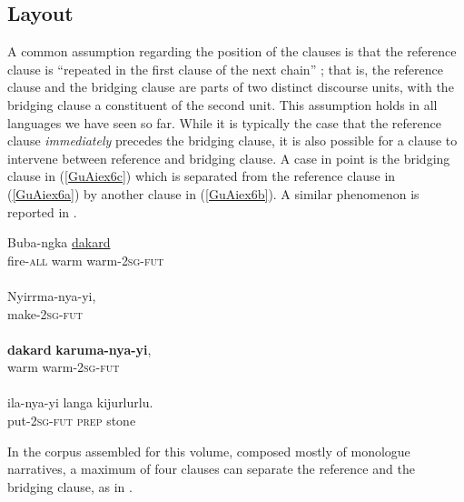 \documentclass[output=paper]{LSP/langsci}
\begin{document}
\subsection{Layout}
\label{GuAi2.1layout}
A common assumption regarding the position of the clauses is that the reference clause is ``repeated in the first clause of the next chain'' \citep[][363]{devries.2005}; that is, the reference clause and the bridging clause are parts of two distinct discourse units, with the bridging clause a constituent of the second unit. This assumption holds in all languages we have seen so far. While it is typically the case that the reference clause \textit{immediately} precedes the bridging clause, it is also possible for a clause to intervene between reference and bridging clause. A case in point is the bridging clause in (\ref{GuAiex6c}) which is separated from the reference clause in (\ref{GuAiex6a}) by another clause in (\ref{GuAiex6b}). A similar phenomenon is reported in  .

\begin{exe}
	\ex	\label{GuAiex6ad}
 {\citealt[][]{Pensalfini}}
\begin{xlist}
\ex	\label{GuAiex6a}
\gll		Buba-ngka   \underline{dakard}     \underline{} \\
			fire-\textsc{all}   warm     warm-\textsc{2sg-fut}\\
		\glt	{} \\
\ex	\label{GuAiex6b}
\gll		Nyirrma-nya-yi, \\
			make-\textsc{2sg-fut} \\
		\glt	{} \\
\ex	\label{GuAiex6c}
\gll		\textbf{dakard}   \textbf{karuma-nya-yi},  \\
			warm    warm-\textsc{2sg-fut}\\
		\glt	{} \\
\ex	\label{GuAiex6d}
\gll ila-nya-yi   langa   kijurlurlu.\\
put-\textsc{2sg-fut}   \textsc{prep}   stone\\
		\glt	{} 
		\end{xlist}
\end{exe}



In the corpus assembled for this volume, composed mostly of monologue narratives, a maximum of four clauses can separate the reference and the bridging clause, as in  . 
\end{document}
